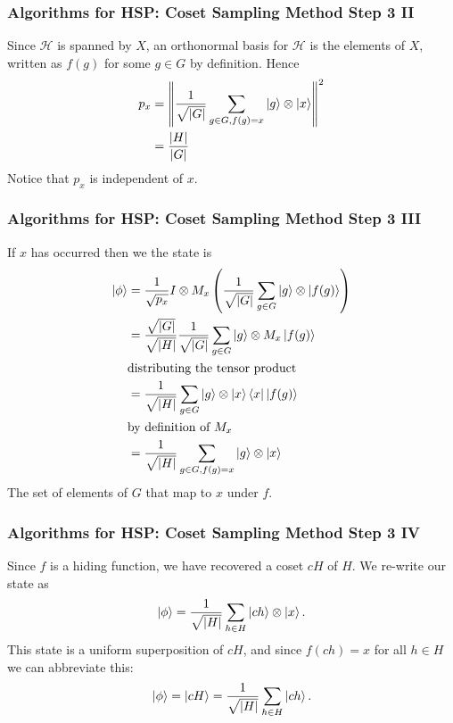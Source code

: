 \documentclass{beamer}
\renewcommand{\bra}{\Bra}
\renewcommand{\ket}{\Ket}
\newcommand{\abs}[1]{\left\lvert #1 \right\rvert}
\newcommand{\norm}[1]{\left\lVert #1 \right\rVert}
\renewcommand{\cal}[1]{\mathcal{#1}}
\begin{document}
\begin{frame}
\frametitle{Algorithms for HSP: Coset Sampling Method Step 3 II}
            Since $\cal{H}$ is spanned by $X$, an orthonormal basis for $\cal{H}$ is the elements of $X$, written as $f(g)$ for some $g \in G$ by definition.
            Hence
            \begin{align*}
            p_x &= \norm{\frac{1}{\sqrt{\abs{G}}} \sum_{g \in G, f(g) = x} \ket{g} \otimes \ket{x}}^2\\
            &= \frac{\abs{H}}{\abs{G}}
            \end{align*}
            Notice that $p_x$ is independent of $x$.
\end{frame}

\begin{frame}
\frametitle{Algorithms for HSP: Coset Sampling Method Step 3 III}
            If $x$ has occurred then we the state is
            \begin{align*}
            \ket{\phi} &= \frac{1}{\sqrt{p_x}} I \otimes M_x \left(\frac{1}{\sqrt{\abs{G}}} \sum_{g \in G} \ket{g} \otimes \ket{f(g)}\right)\\
            &= \frac{\sqrt{\abs{G}}}{\sqrt{\abs{H}}} \frac{1}{\sqrt{\abs{G}}} \sum_{g \in G} \ket{g} \otimes M_x \ket{f(g)}\\
            & \text{distributing the tensor product}\\
            &= \frac{1}{\sqrt{\abs{H}}} \sum_{g \in G} \ket{g} \otimes \ket{x} \bra{x} \ket{f(g)}\\
            & \text{by definition of $M_x$}\\
            &= \frac{1}{\sqrt{\abs{H}}} \sum_{g \in G, f(g) = x} \ket{g} \otimes \ket{x}
            \end{align*}
            The set of elements of $G$ that map to $x$ under $f$.
\end{frame}

\begin{frame}
\frametitle{Algorithms for HSP: Coset Sampling Method Step 3 IV}
            Since $f$ is a hiding function, we have recovered a coset $cH$ of $H$.
            We re-write our state as
                $$\ket{\phi} = \frac{1}{\sqrt{\abs{H}}} \sum_{h \in H} \ket{ch} \otimes \ket{x}.$$
            This state is a uniform superposition of $cH$, and since $f(ch) = x$ for all $h \in H$ we can abbreviate this:
                $$ \ket{\phi} = \ket{cH} = \frac{1}{\sqrt{\abs{H}}} \sum_{h \in H} \ket{ch}.$$
\end{frame}
\end{document}
